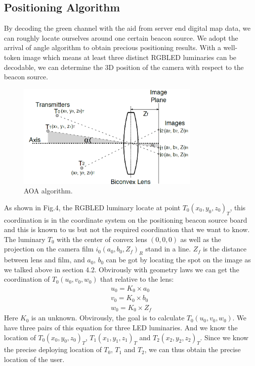 \documentclass[conference]{IEEEtran}
\begin{document}
\subsection{Positioning Algorithm}
By decoding the green channel with the aid from server end digital map data, we can roughly locate ourselves around one certain beacon source. We adopt the arrival of angle algorithm to obtain precious positioning results. With a well-token image which means at least three distinct RGBLED luminaries can be decodable, we can determine the 3D position of the camera with respect to the beacon source.

	\begin{figure}
		\centering
		\includegraphics[width=3.5in]{../img.origin/fig4.png}
		\caption{AOA algorithm.}
		\label{fig_4}
	\end{figure}

As shown in Fig.4, the RGBLED luminary locate at point $T_0(x_0,y_0,z_0)_T$, this coordination is in the coordinate system on the positioning beacon source board and this is known to us but not the required coordination that we want to know. The luminary $T_0$ with the center of convex lens $(0,0,0)$ as well as the projection on the camera film $i_0(a_0, b_0, Z_f)_R$ stand in a line. $Z_f$ is the distance between lens and film, and $a_0$, $b_0$ can be got by locating the spot on the image as we talked above in section 4.2. Obvirously with geometry laws we can get the coordination of $T_0(u_0,v_0,w_0)$ that relative to the lens:
	\begin{equation}
	\begin{split}
	& 	u_0 = K_0 \times a_0\\	
	&	v_0 = K_0 \times b_0\\
	&	w_0 = K_0 \times Z_f
	\end{split}
	\end{equation}
Here $K_0$ is an unknown. Obvirously, the goal is to calculate $T_0(u_0,v_0,w_0)$. We have three pairs of this equation for three LED luminaries. And we know the location of $T_0(x_0,y_0,z_0)_T$,  $T_1(x_1,y_1,z_1)_T$ and  $T_2(x_2,y_2,z_2)_T$. Since we know the precise deploying location of $T_0$, $T_1$ and $T_2$, we can thus obtain the precise location of the user.
\end{document}
